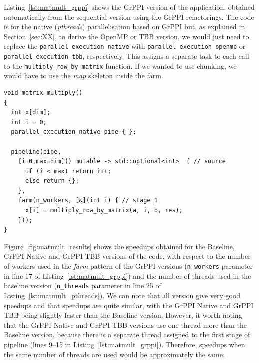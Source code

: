 \noindent
Listing~\ref{lst:matmult_grppi} shows the GrPPI version of the application, obtained automatically from the sequential version using the GrPPI refactorings. The code is for the native (\emph{pthreads}) parallelisation based on GrPPI but, as explained in Section~\ref{sec:XX}, to derive the OpenMP or TBB version, we would just need to replace the \lstinline{parallel_execution_native} with \lstinline{parallel_execution_openmp} or \lstinline{parallel_execution_tbb}, respectively. This assigns a separate task to each call to the \lstinline{multiply_row_by_matrix} function. If we wanted to use chunking, we would have to use the \emph{map} skeleton inside the farm.


\begin{small}
  \begin{lstlisting}[caption=GrPPI Matrix Multiplication\label{lst:matmult_grppi}]
void matrix_multiply()
{
  int x[dim];
  int i = 0;
  parallel_execution_native pipe { };

  pipeline(pipe,
    [i=0,max=dim]() mutable -> std::optional<int>  { // source
      if (i < max) return i++;
      else return {};
    },
    farm(n_workers, [&](int i) { // stage 1
      x[i] = multiply_row_by_matrix(a, i, b, res);
    }));
}
  \end{lstlisting}  
\end{small}

\noindent
Figure~\ref{fig:matmult_results} shows the speedups obtained for the Baseline, GrPPI Native and GrPPI TBB versions of the code, with respect to the number of workers used in the \emph{farm} pattern of the GrPPI versions (\lstinline{n_workers} parameter in line 17 of Listing~\ref{lst:matmult_grppi}) and the number of threads used in the baseline version (\lstinline{n_threads} parameter in line 25 of Listing~\ref{lst:matmult_pthreads}). We can note that all version give very good speedups and that speedups are quite similar, with the GrPPI Native and GrPPI TBB being slightly faster than the Baseline version. However, it worth noting that the GrPPI Native and GrPPI TBB versions use one thread more than the Baseline version, because there is a separate thread assigned to the first stage of  pipeline (lines 9--15 in Listing~\ref{lst:matmult_grppi}). Therefore, speedups when the same number of threads are used would be approximately the same.


